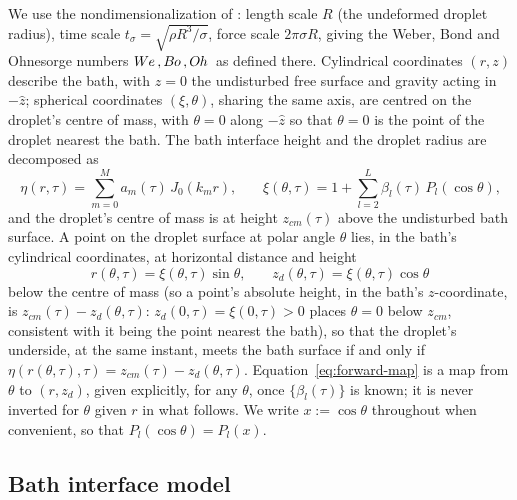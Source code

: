 We use the nondimensionalization of \cite{AlventosaEtAl2023}: length scale $R$ (the undeformed droplet radius), time scale $t_\sigma=\sqrt{\rho R^3/\sigma}$, force scale $2\pi\sigma R$, giving the Weber, Bond and Ohnesorge numbers $W\kern-0.03em e\,,B\kern-0.04em o\,,O\kern-0.04em h\,$ as defined there. Cylindrical coordinates $(r,z)$ describe the bath, with $z=0$ the undisturbed free surface and gravity acting in $-\hat z$; spherical coordinates $(\xi,\theta)$, sharing the same axis, are centred on the droplet's centre of mass, with $\theta=0$ along $-\hat z$ so that $\theta=0$ is the point of the droplet nearest the bath. The bath interface height and the droplet radius are decomposed as
\begin{equation}
    \eta(r,\tau) = \sum_{m=0}^{M} a_m(\tau)\,J_0(k_mr)\text{,}\qquad
    \xi(\theta,\tau) = 1+\sum_{l=2}^{L}\beta_l(\tau)\,P_l(\cos\theta)\text{,}
    \label{eq:eta-xi}
\end{equation}
and the droplet's centre of mass is at height $z_{cm}(\tau)$ above the undisturbed bath surface. A point on the droplet surface at polar angle $\theta$ lies, in the bath's cylindrical coordinates, at horizontal distance and height
\begin{equation}
    r(\theta,\tau) = \xi(\theta,\tau)\sin\theta\text{,}\qquad
    z_d(\theta,\tau) = \xi(\theta,\tau)\cos\theta
    \label{eq:forward-map}
\end{equation}
below the centre of mass (so a point's absolute height, in the bath's $z$-coordinate, is $z_{cm}(\tau)-z_d(\theta,\tau)$: $z_d(0,\tau)=\xi(0,\tau)>0$ places $\theta=0$ below $z_{cm}$, consistent with it being the point nearest the bath), so that the droplet's underside, at the same instant, meets the bath surface if and only if $\eta(r(\theta,\tau),\tau)=z_{cm}(\tau)-z_d(\theta,\tau)$. Equation~\eqref{eq:forward-map} is a map from $\theta$ to $(r,z_d)$, given explicitly, for any $\theta$, once $\{\beta_l(\tau)\}$ is known; it is never inverted for $\theta$ given $r$ in what follows. We write $x:=\cos\theta$ throughout when convenient, so that $P_l(\cos\theta)=P_l(x)$.

\subsection{Bath interface model}
\label{subsec:bath}

